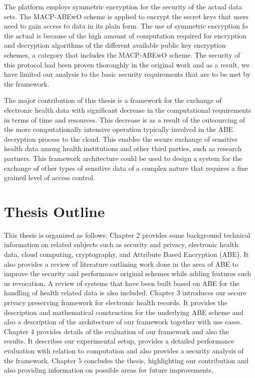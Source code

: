 The platform employs symmetric encryption for the security of the actual data sets. The MACP-ABEwO scheme is applied to encrypt the secret keys that users need to gain access to data in its plain form. The use of symmetric encryption fo the actual is because of the high amount of computation required for encryption and decryption algorithms of the different available public key encryption schemes, a category that includes the MACP-ABEwO scheme. The security of this protocol had been proven thoroughly in the original work \cite{Yang2014} and as a result, we have limited our analysis to the basic security requirements that are to be met by the framework.

The major contribution of this thesis is a framework for the exchange of electronic health data with significant decrease in the computational requirements in terms of time and resources. This decrease is as a result of the outsourcing of the more computationally intensive operation typically involved in the ABE decryption process to the cloud. This enables the secure exchange of sensitive health data among health institutions and other third parties, such as research partners. This framework architecture could be used to design a system for the exchange of other types of sensitive data of a complex nature that requires a fine grained level of access control.


\section{Thesis Outline}

This thesis is organized as follows: Chapter 2 provides some background technical information on related subjects such as security and privacy, electronic health data, cloud computing, cryptography, and Attribute Based Encryption (ABE). It also provides a review of literature outlining work done in the area of ABE to improve the security and performance original schemes while adding features such as revocation. A review of systems that have been built based on ABE for the handling of health related data is also included. Chapter 3 introduces our secure privacy preserving framework for electronic health records. It provides the description and mathematical construction for the underlying ABE scheme and also a description of the architecture of our framework together with use cases. Chapter 4 provides details of the evaluation of our framework and also the results. It describes our experimental setup, provides a detailed performance evaluation with relation to computation and also provides a security analysis of the framework. Chapter 5 concludes the thesis, highlighting our contribution and also providing information on possible areas for future improvements.